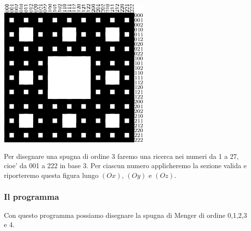 \begin{center}
	\includegraphics{pics/menger-schema10.png}\\ 
\end{center}

Per disegnare una spugna di ordine 3 faremo una ricerca nei numeri da 1 a 27, cioe' da 001 a 222 in base 3. Per ciascun numero applicheremo la sezione valida e riporteremo questa figura lungo $(Ox)$, $(Oy)$ e $(Oz)$.


\subsubsection{Il programma}
Con questo programma possiamo disegnare la spugna di Menger di ordine 0,1,2,3 e 4.

